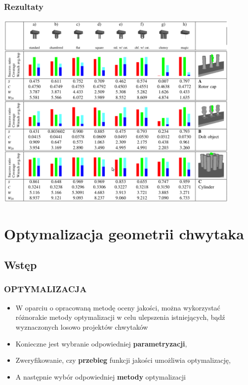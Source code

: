 \documentclass[12pt,a4paper,portrait]{beamer}
\begin{document}
\begin{frame}
\frametitle{Rezultaty}
\begin{center}
\includegraphics[width=0.9\textwidth]{images/oldresults}
\end{center}
\end{frame}


\section{Optymalizacja geometrii chwytaka}
\subsection{Wstęp}
\begin{frame}
\frametitle{OPTYMALIZACJA}
\begin{itemize}
\item W oparciu o opracowaną metodę oceny jakości, można wykorzystać różnorakie metody optymalizacji w celu ulepszenia istniejących, bądź wyznaczonych losowo projektów chwytaków
\item Konieczne jest wybranie odpowiedniej \textbf{parametryzacji},
\item Zweryfikowanie, czy \textbf{przebieg} funkcji jakości umożliwia optymalizację,
\item A następnie wybór odpowiedniej \textbf{metody} optymalizacji
\end{itemize}
\end{frame}
\end{document}
